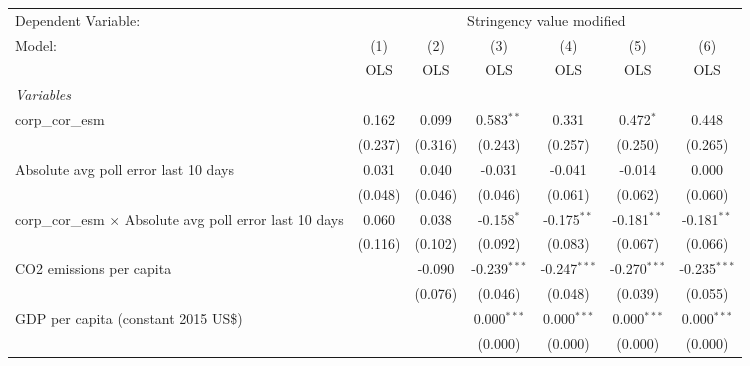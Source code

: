 
\begingroup
\centering
\begin{tabular}{lcccccc}
   \toprule
   Dependent Variable: & \multicolumn{6}{c}{Stringency value modified}\\
   Model:                                                          & (1)     & (2)     & (3)            & (4)            & (5)            & (6)\\  
                                                                   &  OLS    & OLS     & OLS            & OLS            & OLS            & OLS\\  
   \midrule
   \emph{Variables}\\
   corp\_cor\_esm                                                  & 0.162   & 0.099   & 0.583$^{**}$   & 0.331          & 0.472$^{*}$    & 0.448\\   
                                                                   & (0.237) & (0.316) & (0.243)        & (0.257)        & (0.250)        & (0.265)\\   
   Absolute avg poll error last 10 days                            & 0.031   & 0.040   & -0.031         & -0.041         & -0.014         & 0.000\\   
                                                                   & (0.048) & (0.046) & (0.046)        & (0.061)        & (0.062)        & (0.060)\\   
   corp\_cor\_esm $\times$ Absolute avg poll error last 10 days    & 0.060   & 0.038   & -0.158$^{*}$   & -0.175$^{**}$  & -0.181$^{**}$  & -0.181$^{**}$\\   
                                                                   & (0.116) & (0.102) & (0.092)        & (0.083)        & (0.067)        & (0.066)\\   
   CO2 emissions per capita                                        &         & -0.090  & -0.239$^{***}$ & -0.247$^{***}$ & -0.270$^{***}$ & -0.235$^{***}$\\   
                                                                   &         & (0.076) & (0.046)        & (0.048)        & (0.039)        & (0.055)\\   
   GDP per capita (constant 2015 US\$)                             &         &         & 0.000$^{***}$  & 0.000$^{***}$  & 0.000$^{***}$  & 0.000$^{***}$\\   
                                                                   &         &         & (0.000)        & (0.000)        & (0.000)        & (0.000)\\   

\end{tabular}
